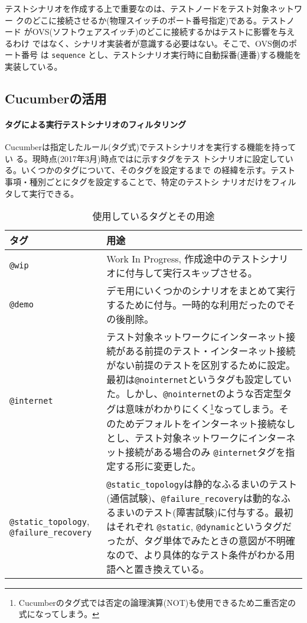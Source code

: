 テストシナリオを作成する上で重要なのは、テストノードをテスト対象ネットワー
クのどこに接続させるか(物理スイッチのポート番号指定)である。テストノード
がOVS(ソフトウェアスイッチ)のどこに接続するかはテストに影響を与えるわけ
ではなく、シナリオ実装者が意識する必要はない。そこで、OVS側のポート番号
は \verb|sequence| とし、テストシナリオ実行時に自動採番(連番)する機能を
実装している。

  \subsection{Cucumberの活用}

    \paragraph{タグによる実行テストシナリオのフィルタリング}
Cucumberは指定したルール(タグ式)でテストシナリオを実行する機能を持ってい
る。現時点(2017年3月)時点ではに示すタグをテス
トシナリオに設定している。いくつかのタグについて、そのタグを設定するまで
の経緯を示す。テスト事項・種別ごとにタグを設定することで、特定のテストシ
ナリオだけをフィルタして実行できる。

\begin{table}[h]
 \centering
 \caption{使用しているタグとその用途}
 \label{tab:scenario_tags}
 \begin{tabularx}{\linewidth}{p{10em}|X}
  \hline
  タグ & 用途 \\
  \hline
  \hline
  \verb|@wip| & Work In Progress, 作成途中のテストシナリオに付与して実行スキップさせる。\\ \hline
  \verb|@demo| & デモ用にいくつかのシナリオをまとめて実行するために付与。一時的な利用だったのでその後削除。 \\ \hline
  \verb|@internet| & テスト対象ネットワークにインターネット接続がある前提のテスト・インターネット接続がない前提のテストを区別するために設定。最初は\verb|@nointernet|というタグも設定していた。しかし、\verb|@nointernet|のような否定型タグは意味がわかりにくく\footnote{Cucumberのタグ式では否定の論理演算(NOT)も使用できるため二重否定の式になってしまう。}なってしまう。そのためデフォルトをインターネット接続なしとし、テスト対象ネットワークにインターネット接続がある場合のみ \verb|@internet|タグを指定する形に変更した。 \\ \hline
  \verb|@static_topology|, \verb|@failure_recovery| & \verb|@static_topology|は静的なふるまいのテスト(通信試験)、\verb|@failure_recovery|は動的なふるまいのテスト(障害試験)に付与する。最初はそれぞれ \verb|@static|, \verb|@dynamic|というタグだったが、タグ単体でみたときの意図が不明確なので、より具体的なテスト条件がわかる用語へと置き換えている。\\
  \hline
 \end{tabularx}
\end{table}

